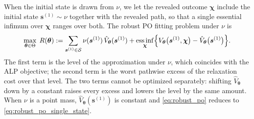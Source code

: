 \documentclass[11pt]{article}
\theoremstyle{definition}
\begin{document}
When the initial state is drawn from \(\nu\), we let the revealed outcome \(\boldsymbol{\chi}\) include the initial state \(\boldsymbol{s}^{(1)}\sim\nu\) together with the revealed path, so that a single essential infimum over \(\boldsymbol{\chi}\) ranges over both. The robust PO fitting problem under \(\nu\) is
\begin{equation}
\label{eq:robust_po}
\max_{\boldsymbol{\theta}\in\Theta}\;
R(\boldsymbol{\theta})
:= \sum_{\boldsymbol{s}^{(1)}\in\mathcal S}\nu(\boldsymbol{s}^{(1)})\,\hat V_{\boldsymbol{\theta}}(\boldsymbol{s}^{(1)})
+ \operatorname*{ess\,inf}_{\boldsymbol{\chi}}
\Bigl\{V_{\boldsymbol{\theta}}\bigl(\boldsymbol{s}^{(1)},\boldsymbol{\chi}\bigr)-\hat V_{\boldsymbol{\theta}}\bigl(\boldsymbol{s}^{(1)}\bigr)\Bigr\}.
\end{equation}
The first term is the level of the approximation under \(\nu\), which coincides with the ALP objective; the second term is the worst pathwise excess of the relaxation cost over that level. The two terms cannot be optimized separately: shifting \(\hat V_{\boldsymbol{\theta}}\) down by a constant raises every excess and lowers the level by the same amount. When \(\nu\) is a point mass, \(\hat V_{\boldsymbol{\theta}}(\boldsymbol{s}^{(1)})\) is constant and \eqref{eq:robust_po} reduces to \eqref{eq:robust_po_single_state}.
\end{document}
